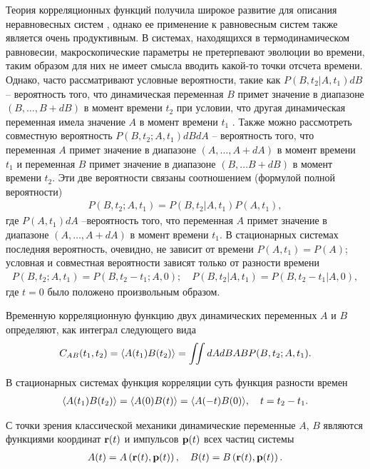 Теория корреляционных функций получила широкое развитие для описания неравновесных систем \cite{zwanzig1965}, однако ее применение к равновесным систем также является очень продуктивным. В системах, находящихся в термодинамическом равновесии, макроскопические параметры не претерпевают эволюции во времени, таким образом для них не имеет смысла вводить какой-то точки отсчета времени. Однако, часто рассматривают условные вероятности, такие как $P(B, t_2 \vert A, t_1) dB$ -- вероятность того, что динамическая переменная $B$ примет значение в диапазоне $(B, \dots, B + dB)$ в момент времени $t_2$ при условии, что другая динамическая переменная имела значение $A$ в момент времени $t_1$ \cite{nitzan2006}. Также можно рассмотреть совместную вероятность $P(B, t_2; A, t_1) dB dA$ -- вероятность того, что переменная $A$ примет значение в диапазоне $(A, \dots, A+dA)$ в момент времени $t_1$ и переменная $B$ примет значение в диапазоне $(B, \dots B+dB)$ в момент времени $t_2$. Эти две вероятности связаны соотношением (формулой полной вероятности)
\begin{gather}
    P(B, t_2; A, t_1) = P(B, t_2 \vert A, t_1) P(A, t_1), 
\end{gather}
где $P(A, t_1) dA$ --вероятность того, что переменная $A$ примет значение в диапазоне $(A, \dots, A+dA)$ в момент времени $t_1$. В стационарных системах последняя вероятность, очевидно, не зависит от времени $P(A, t_1) = P(A)$; условная и совместная вероятности зависят только от разности времени
\begin{gather}
    P(B, t_2; A, t_1) = P(B, t_2 - t_1; A, 0); \quad P(B, t_2 \vert A, t_1) = P(B, t_2 - t_1 \vert A, 0),
\end{gather}
%
где $t = 0$ было положено произвольным образом.\par
Временную корреляционную функцию двух динамических переменных $A$ и $B$ определяют, как интеграл следующего вида 
\begin{gather}
    C_{AB}(t_1, t_2) = \langle  A(t_1) B(t_2)  \rangle = \iint dA dB AB P(B, t_2; A, t_1). \label{part1-correlation-function-definition}
\end{gather}

В стационарных системах функция корреляции суть функция разности времен
\begin{gather}
    \langle  A(t_1) B(t_2)  \rangle = \langle  A(0) B(t)  \rangle = \langle  A(-t) B(0)  \rangle, \quad t = t_2 - t_1.
\end{gather}

С точки зрения классической механики динамические переменные $A$, $B$ являются функциями координат $\mathbf{r}(t)$ и импульсов $\mathbf{p}(t)$ всех частиц системы
\begin{gather}
    A(t) = A \left( \mathbf{r}(t), \mathbf{p}(t) \right), \quad B(t) = B \left( \mathbf{r}(t), \mathbf{p}(t) \right).
\end{gather}

